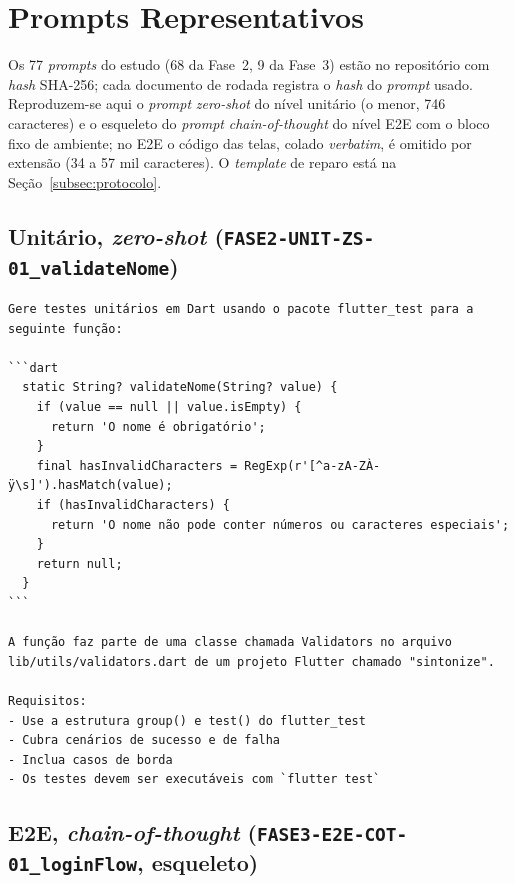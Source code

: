 \documentclass[12pt]{article}
\begin{document}



\appendix

\section{Prompts Representativos}
\label{sec:apendice-prompts}

Os 77 \textit{prompts} do estudo (68 da Fase~2, 9 da Fase~3) estão no
repositório com \textit{hash} SHA-256; cada documento de rodada registra o
\textit{hash} do \textit{prompt} usado. Reproduzem-se aqui o \textit{prompt}
\textit{zero-shot} do nível unitário (o menor, 746 caracteres) e o esqueleto
do \textit{prompt} \textit{chain-of-thought} do nível E2E com o bloco fixo de
ambiente; no E2E o código das telas, colado \textit{verbatim}, é omitido por
extensão (34 a 57 mil caracteres). O \textit{template} de reparo está na
Seção~\ref{subsec:protocolo}.

\subsection{Unitário, \textit{zero-shot} (\texttt{FASE2-UNIT-ZS-01\_validateNome})}

{\scriptsize
\begin{verbatim}
Gere testes unitários em Dart usando o pacote flutter_test para a seguinte função:

```dart
  static String? validateNome(String? value) {
    if (value == null || value.isEmpty) {
      return 'O nome é obrigatório';
    }
    final hasInvalidCharacters = RegExp(r'[^a-zA-ZÀ-ÿ\s]').hasMatch(value);
    if (hasInvalidCharacters) {
      return 'O nome não pode conter números ou caracteres especiais';
    }
    return null;
  }
```

A função faz parte de uma classe chamada Validators no arquivo
lib/utils/validators.dart de um projeto Flutter chamado "sintonize".

Requisitos:
- Use a estrutura group() e test() do flutter_test
- Cubra cenários de sucesso e de falha
- Inclua casos de borda
- Os testes devem ser executáveis com `flutter test`
\end{verbatim}
}

\subsection{E2E, \textit{chain-of-thought} (\texttt{FASE3-E2E-COT-01\_loginFlow}, esqueleto)}
\end{document}
